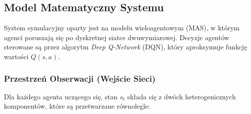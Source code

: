 \documentclass[12pt,a4paper]{article}
\begin{document}
\newpage
\subsection{Model Matematyczny Systemu}

System symulacyjny oparty jest na modelu wieloagentowym (MAS), w którym agenci
poruszają się po dyskretnej siatce dwuwymiarowej. Decyzje agentów sterowane są
przez algorytm \textit{Deep Q-Network} (DQN), który aproksymuje funkcję
wartości $Q(s, a)$.

\subsubsection{Przestrzeń Obserwacji (Wejście Sieci)}

Dla każdego agenta uczącego się, stan $s_t$ składa się z dwóch heterogenicznych
komponentów, które są przetwarzane równolegle:
\end{document}
